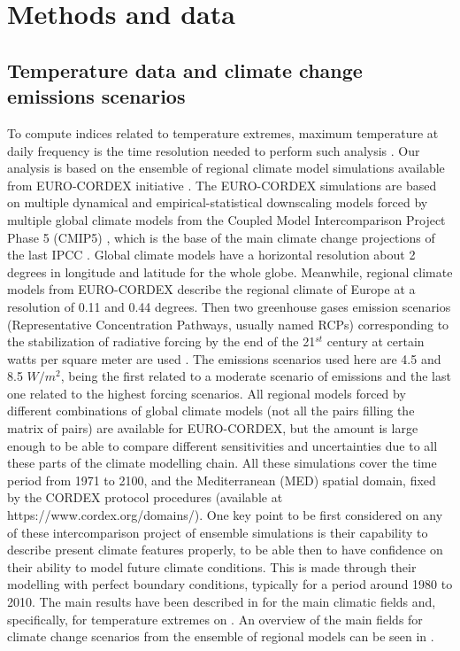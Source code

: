 \section{Methods and data}

\subsection{Temperature data and climate change emissions scenarios}

To compute indices related to temperature extremes, maximum temperature at daily frequency is the
time resolution needed to perform such analysis \cite{per2015}.
Our analysis is based on the ensemble of regional climate model simulations available
from EURO-CORDEX initiative \cite{jac_al2014,kot_al2014}. The EURO-CORDEX simulations 
are based on multiple dynamical and empirical-statistical downscaling models forced 
by multiple global climate models from the Coupled Model Intercomparison 
Project Phase 5 (CMIP5) \cite{tay_al2012}, which is the base of the
main climate change projections of the last IPCC \cite{sto2014}.
Global climate models have a horizontal resolution about
2 degrees in longitude and latitude for the whole globe. Meanwhile, regional climate models
from EURO-CORDEX describe the regional climate of Europe at a resolution
of 0.11 and 0.44 degrees.
Then two greenhouse gases emission scenarios (Representative Concentration Pathways, 
usually named RCPs) corresponding to the stabilization of 
radiative forcing by the end of the 21$^{st}$ century at certain watts per
square meter are used \cite{mos_al2010}. The emissions scenarios used here are 4.5 and 8.5 $W/m^2$,
being the first related to a moderate scenario of emissions and the last one related to the highest forcing scenarios.
All regional models forced by different combinations of global climate
models (not all the pairs filling the matrix of pairs) are available for
EURO-CORDEX, but the amount is large enough to be able to compare different
sensitivities and uncertainties due to all these parts of the climate modelling chain.
All these simulations cover the time period from 1971 to 2100, and the Mediterranean (MED) spatial
domain, fixed by the CORDEX protocol procedures (available at https://www.cordex.org/domains/).
One key point to be first considered on any of these intercomparison
project of ensemble simulations is their capability 
to describe present climate features properly, to be able then to
have confidence on their ability to model future climate conditions. This is made through their modelling
with perfect boundary conditions, typically for
a period around 1980 to 2010. The main 
results have been described in \cite{kot_al2014} for the
main climatic fields and, specifically, for temperature extremes on \cite{vau_al2013}. An overview of the main fields for climate change
scenarios from the ensemble of regional models can be seen in \cite{jac_al2014}.

